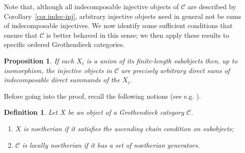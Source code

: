 \documentclass[11pt]{article}
\theoremstyle{plain}
\newtheorem{proposition}[lemma]{Proposition}
\theoremstyle{nonumberplain}
\theoremstyle{plain}
\newtheorem{definition}[lemma]{Definition}
\newtheorem{remark}[lemma]{Remark}
\theoremstyle{nonumberplain}
\newcommand\cC{\mathcal C}
\DeclareMathOperator{\Hom}{\mathrm{Hom}}
\begin{document}




Note that, although all indecomposable injective objects of $\mathcal{C}$ are described by Corollary~\ref{cor.indec-inj}, arbitrary injective objects need in general not be sums of
indecomposable injectives. We now identify some
sufficient conditions that ensure that $\cC$ is better behaved in this
sense; we then apply these results to specific ordered Grothendieck categories.


 


\begin{proposition}\label{pr.loc-noe}
  If each $X_i$ is a union of its finite-length subobjects then, up to isomorphism,  the
  injective objects in $\cC$ are precisely arbitrary direct sums of
  indecomposable direct summands of the $X_i$. 
\end{proposition}



Before going into the proof, recall the following notions (see
e.g. \cite[$\S$5.7 and $\S$5.8]{groth}).



\begin{definition}\label{def.loc-noe}
  Let $X$ be an object of a Grothendieck category $\cC$.
  \begin{enumerate}
   \item $X$ is {\it noetherian} if it satisfies the ascending chain condition on subobjects;
   \item $\cC$ is {\it locally noetherian} if it has a set of
      noetherian generators.
  \end{enumerate}
\end{definition}


\end{document}

